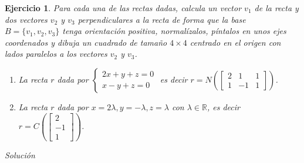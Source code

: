 \documentclass{amsart}
\newtheorem{ejer}{Ejercicio}
\begin{document}


\begin{ejer}
Para cada una de las rectas dadas, calcula un vector $v_1$ de la recta y dos vectores 
$v_2$ y $v_3$ perpendiculares a la recta de forma que la base $B = \{v_1,v_2,v_3\}$ tenga 
orientación positiva, normalízalos, píntalos en unos ejes coordenados y dibuja un cuadrado de 
tamaño $4\times 4$ centrado en el origen con lados paralelos a los vectores $v_2$ y $v_3$.

\begin{enumerate}
\item La recta $r$ dada por 
$
\begin{cases}
2x+y+z = 0 \\
x-y+z = 0
\end{cases}
$ es decir $r = N\left(\left[\begin{array}{ccc} 2 & 1 & 1 \\ 1 & -1 & 1 \end{array} \right]\right)$.
\item La recta $r$ dada por $x = 2\lambda, y = -\lambda, z = \lambda$ 
con $\lambda \in {\mathbb R}$, es decir
$r = C\left(\left[\begin{array}{c} 2 \\ -1 \\ 1 \end{array} \right]\right)$.
\end{enumerate}
\end{ejer}

{\it Solución}

\end{document}
